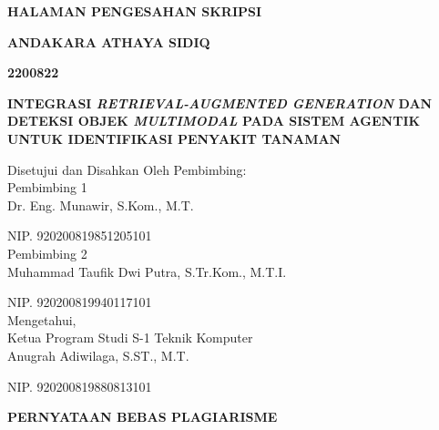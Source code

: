 \documentclass[12pt, a4paper, oneside]{report}
\newcommand{\thesistitle}{INTEGRASI \textit{RETRIEVAL-AUGMENTED GENERATION} DAN DETEKSI OBJEK \textit{MULTIMODAL} PADA SISTEM AGENTIK UNTUK IDENTIFIKASI PENYAKIT TANAMAN}
\newcommand{\authorname}{Andakara Athaya Sidiq}
\newcommand{\studentid}{2200822}
\newcommand{\advisorone}{Dr. Eng. Munawir, S.Kom., M.T.}
\newcommand{\advisoronenip}{920200819851205101}
\newcommand{\advisortwo}{Muhammad Taufik Dwi Putra, S.Tr.Kom., M.T.I.}
\newcommand{\advisortwonip}{920200819940117101}
\newcommand{\programhead}{Anugrah Adiwilaga, S.ST., M.T.}
\newcommand{\programheadnip}{920200819880813101}
\begin{document}
\clearpage
{}
\begin{center}
    {\bfseries HALAMAN PENGESAHAN SKRIPSI \par}
    \vspace{\baselineskip}
    {\bfseries \MakeUppercase{\authorname} \par}
    {\bfseries \studentid \par}
    \vspace{\baselineskip}
    {\bfseries \MakeUppercase{\thesistitle} \par}
    \vspace{\baselineskip}
    Disetujui dan Disahkan Oleh Pembimbing: \\
    Pembimbing 1 \\
    \vfill
    \advisorone \par
    NIP. \advisoronenip \\
    \vspace{\baselineskip}
    Pembimbing 2 \\
    \vfill
    \advisortwo \par
    NIP. \advisortwonip \\
    \vspace{\baselineskip}
    Mengetahui, \\
    Ketua Program Studi S-1 Teknik Komputer \\
    \vfill
    \programhead \par
    NIP. \programheadnip
\end{center}
\clearpage

\clearpage
{}
\begin{center}
    {\bfseries PERNYATAAN BEBAS PLAGIARISME \par}
\end{center}
\vspace{\baselineskip}
\end{document}
